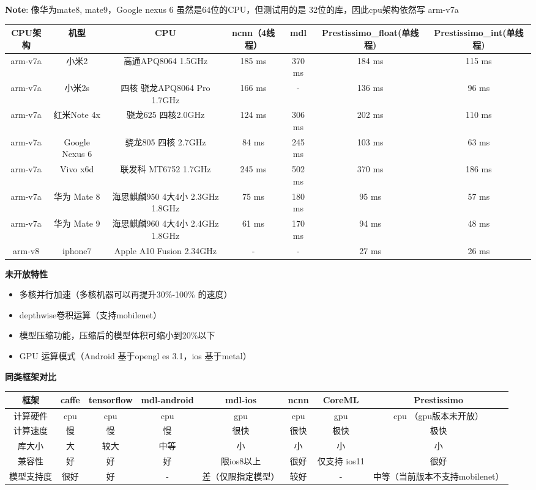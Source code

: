 \textbf{Note}: 像华为mate8, mate9，Google nexus 6
虽然是64位的CPU，但测试用的是 32位的库，因此cpu架构依然写 arm-v7a

\begin{longtable}[]{ ccccccc }
\toprule
CPU架构 & 机型 & CPU & ncnn（4线程） & mdl & Prestissimo\_float(单线程)
& Prestissimo\_int(单线程)\tabularnewline
\midrule
\endhead
arm-v7a & 小米2 & 高通APQ8064 1.5GHz & 185 ms & 370 ms & 184 ms & 115
ms\tabularnewline
arm-v7a & 小米2s & 四核 骁龙APQ8064 Pro 1.7GHz & 166 ms & - & 136 ms &
96 ms\tabularnewline
arm-v7a & 红米Note 4x & 骁龙625 四核2.0GHz & 124 ms & 306 ms & 202 ms &
110 ms\tabularnewline
arm-v7a & Google Nexus 6 & 骁龙805 四核 2.7GHz & 84 ms & 245 ms & 103 ms
& 63 ms\tabularnewline
arm-v7a & Vivo x6d & 联发科 MT6752 1.7GHz & 245 ms & 502 ms & 370 ms &
186 ms\tabularnewline
arm-v7a & 华为 Mate 8 & 海思麒麟950 4大4小 2.3GHz 1.8GHz & 75 ms & 180
ms & 95 ms & 57 ms\tabularnewline
arm-v7a & 华为 Mate 9 & 海思麒麟960 4大4小 2.4GHz 1.8GHz & 61 ms & 170
ms & 94 ms & 48 ms\tabularnewline
arm-v8 & iphone7 & Apple A10 Fusion 2.34GHz & - & - & 27 ms & 26
ms\tabularnewline
\bottomrule
\end{longtable}

\textbf{未开放特性}

\begin{itemize}
\item
  多核并行加速（多核机器可以再提升30\%-100\% 的速度）
\item
  depthwise卷积运算（支持mobilenet）
\item
  模型压缩功能，压缩后的模型体积可缩小到20\%以下
\item
  GPU 运算模式（Android 基于opengl es 3.1，ios 基于metal）
\end{itemize}

\textbf{同类框架对比}

\begin{longtable}[]{ cccccccc }
\toprule
框架 & caffe & tensorflow & mdl-android & mdl-ios & ncnn & CoreML &
Prestissimo\tabularnewline
\midrule
\endhead
计算硬件 & cpu & cpu & cpu & gpu & cpu & gpu & cpu
（gpu版本未开放）\tabularnewline
计算速度 & 慢 & 慢 & 慢 & 很快 & 很快 & 极快 & 极快\tabularnewline
库大小 & 大 & 较大 & 中等 & 小 & 小 & 小 & 小\tabularnewline
兼容性 & 好 & 好 & 好 & 限ios8以上 & 很好 & 仅支持 ios11 &
很好\tabularnewline
模型支持度 & 很好 & 好 & - & 差（仅限指定模型） & 较好 & - &
中等（当前版本不支持mobilenet）\tabularnewline
\bottomrule
\end{longtable}

